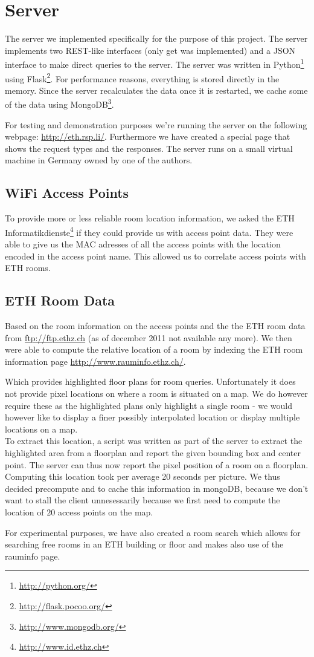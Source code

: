 \section{Server}
The server we implemented specifically for the purpose of this project. The server implements two REST-like interfaces (only get was implemented) and a JSON interface to make direct queries to the server. 
The server was written in Python\footnote{\url{http://python.org/}} using Flask\footnote{\url{http://flask.pocoo.org/}}. For performance reasons, everything is stored directly in the memory. Since the server recalculates the data once it is restarted, we cache some of the data using MongoDB\footnote{\url{http://www.mongodb.org/}}. 

For testing and demonstration purposes we're running the server on the following webpage: \url{http://eth.rsp.li/}. Furthermore we have created a special page that shows the request types and the responses. The server runs on a small virtual machine in Germany owned by one of the authors. 
\subsection{WiFi Access Points}
To provide more or less reliable room location information, we asked the ETH Informatikdienste\footnote{\url{http://www.id.ethz.ch}} if they could provide us with access point data. They were able to give us the MAC adresses of all the access points with the location encoded in the access point name. This allowed us to correlate access points with ETH rooms. 
\subsection{ETH Room Data}
Based on the room information on the access points and the the ETH room data from \url{ftp://ftp.ethz.ch} (as of december 2011 not available any more). We then were able to compute the relative location of a room by indexing the ETH room information page \url{http://www.rauminfo.ethz.ch/}. 

Which provides highlighted floor plans for room queries. Unfortunately it does not provide pixel locations on where a room is situated on a map. We do however require these as the highlighted plans only highlight a single room - we would however like to display a finer possibly interpolated location or display multiple locations on a map.\\
To extract this location, a script was written as part of the server to extract the highlighted area from a floorplan and report the given bounding box and center point. The server can thus now report the pixel position of a room on a floorplan.
Computing this location took per average 20 seconds per picture. We thus decided precompute and to cache this information in mongoDB, because we don't want to stall the client unnesessarily because we first need to compute the location of $20$ access points on the map. 

For experimental purposes, we have also created a room search which allows for searching free rooms in an ETH building or floor and makes also use of the rauminfo page. 